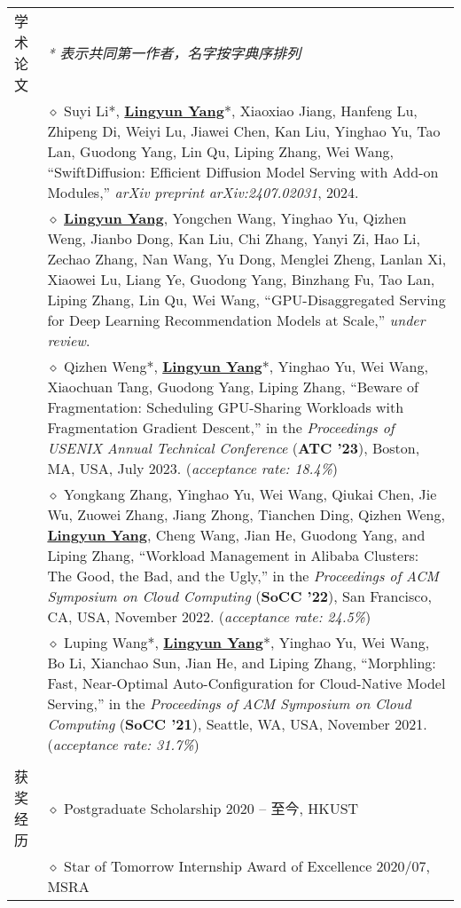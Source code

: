 \documentclass[letterpaper, 10pt]{article}
\begin{document}
\begin{longtable}{p{0.7in}p{6.0in}}
{学术论文}
& \textit{* 表示共同第一作者，名字按字典序排列} \\
& $\diamond$ Suyi Li*, \textbf{\underline{Lingyun Yang}}*, Xiaoxiao Jiang, Hanfeng Lu, Zhipeng Di, Weiyi Lu, Jiawei Chen, Kan Liu, Yinghao Yu, Tao Lan, Guodong Yang, Lin Qu, Liping Zhang, Wei Wang, “SwiftDiffusion: Efficient Diffusion Model Serving with Add-on Modules,” \textit{arXiv preprint arXiv:2407.02031}, 2024. \\
& $\diamond$ \textbf{\underline{Lingyun Yang}}, Yongchen Wang, Yinghao Yu, Qizhen Weng, Jianbo Dong, Kan Liu, Chi Zhang, Yanyi Zi, Hao Li, Zechao Zhang, Nan Wang, Yu Dong, Menglei Zheng, Lanlan Xi, Xiaowei Lu, Liang Ye, Guodong Yang, Binzhang Fu, Tao Lan, Liping Zhang, Lin Qu, Wei Wang, “GPU-Disaggregated Serving for Deep Learning Recommendation Models at Scale,” \textit{under review}. \\
& $\diamond$ Qizhen Weng*, \textbf{\underline{Lingyun Yang}}*, Yinghao Yu, Wei Wang, Xiaochuan Tang, Guodong Yang, Liping Zhang, “Beware of Fragmentation: Scheduling GPU-Sharing Workloads with Fragmentation Gradient Descent,” in the \textit{Proceedings of USENIX Annual Technical Conference} (\textbf{ATC '23}), Boston, MA, USA, July 2023. (\textit{acceptance rate: 18.4\%}) \\
& $\diamond$ Yongkang Zhang, Yinghao Yu, Wei Wang, Qiukai Chen, Jie Wu, Zuowei Zhang, Jiang Zhong, Tianchen Ding, Qizhen Weng, \textbf{\underline{Lingyun Yang}}, Cheng Wang, Jian He, Guodong Yang, and Liping Zhang, “Workload Management in Alibaba Clusters: The Good, the Bad, and the Ugly,” in the \textit{Proceedings of ACM Symposium on Cloud Computing} (\textbf{SoCC '22}), San Francisco, CA, USA, November 2022. (\textit{acceptance rate: 24.5\%}) \\
& $\diamond$ Luping Wang*, \textbf{\underline{Lingyun Yang}}*, Yinghao Yu, Wei Wang, Bo Li, Xianchao Sun, Jian He, and Liping Zhang, “Morphling: Fast, Near-Optimal Auto-Configuration for Cloud-Native Model Serving,” in the \textit{Proceedings of ACM Symposium on Cloud Computing} (\textbf{SoCC '21}), Seattle, WA, USA, November 2021. (\textit{acceptance rate: 31.7\%}) \\
& \\

{获奖经历}
& $\diamond$ Postgraduate Scholarship \hfill 2020 -- 至今, HKUST \\

& $\diamond$ Star of Tomorrow Internship Award of Excellence \hfill 2020/07, MSRA \\


\end{longtable}
\end{document}

